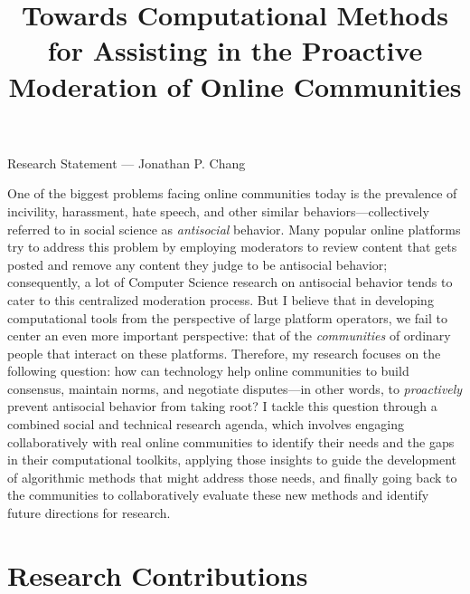 \documentclass[11pt,letterpaper]{article}
\title{Towards Computational Methods for Assisting in the Proactive Moderation of Online Communities}
\begin{document}
\maketitle

\begin{center}
Research Statement --- Jonathan P. Chang
\end{center}

One of the biggest problems facing online communities today is the prevalence of incivility, harassment, hate speech, and other similar behaviors---collectively referred to in social science as \emph{antisocial} behavior.
Many popular online platforms try to address this problem by employing moderators to review content that gets posted and remove any content they judge to be antisocial behavior; consequently, a lot of Computer Science research on antisocial behavior tends to cater to this centralized moderation process.
But I believe that in developing computational tools from the perspective of large platform operators, we fail to center an even more important perspective: that of the \emph{communities} of ordinary people that interact on these platforms.
Therefore, my research focuses on the following question: how can technology help online communities to build consensus, maintain norms, and negotiate disputes---in other words, to \emph{proactively} prevent antisocial behavior from taking root?
I tackle this question through a combined social and technical research agenda, which involves engaging collaboratively with real online communities to identify their needs and the gaps in their computational toolkits, applying those insights to guide the development of algorithmic methods that might address those needs, and finally going back to the communities to collaboratively evaluate these new methods and identify future directions for research.

\section{Research Contributions}
\end{document}
